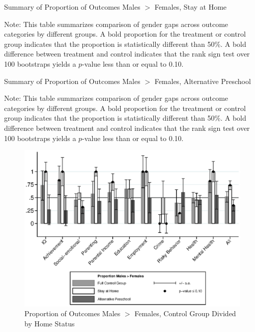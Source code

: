 \begin{table}[H]
\centering
\caption{Summary of Proportion of Outcomes Males $>$ Females, Stay at Home}
\label{tab:proportion-table}
\begin{threeparttable}

\begin{tablenotes}
\footnotesize
\item Note: This table summarizes comparison of gender gaps across outcome categories by different groups. A bold proportion for the treatment or control group indicates that the proportion is statistically different than 50\%. A bold difference between treatment and control indicates that the rank sign test over 100 bootstraps yields a $p$-value less than or equal to 0.10. 
\end{tablenotes}
\end{threeparttable}
\end{table}

\begin{table}[H]
\centering
\caption{Summary of Proportion of Outcomes Males $>$ Females, Alternative Preschool}
\label{tab:proportion-table}
\begin{threeparttable}

\begin{tablenotes}
\footnotesize
\item Note: This table summarizes comparison of gender gaps across outcome categories by different groups. A bold proportion for the treatment or control group indicates that the proportion is statistically different than 50\%. A bold difference between treatment and control indicates that the rank sign test over 100 bootstraps yields a $p$-value less than or equal to 0.10. 
\end{tablenotes}
\end{threeparttable}
\end{table}


\begin{figure}
\centering
\caption{Proportion of Outcomes Males $>$ Females, Control Group Divided by Home Status}\label{fig3}
\includegraphics[width=\textwidth]{output/gendergaps-control-moderated-altpre}
\end{figure}

